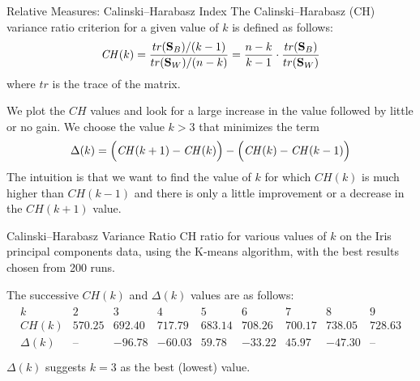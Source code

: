 \begin{frame}{Relative Measures: Calinski--Harabasz Index}
The Calinski--Harabasz (CH) variance ratio criterion for a given value of $k$
is def\/{i}ned as follows:
\begin{align*}
  \mathit{CH}(k) = \frac{tr(\mathbf{S}_B)/(k-1)}{tr(\mathbf{S}_W)/(n-k)} =
  \frac{n-k}{k-1} \cdot \frac{tr(\mathbf{S}_B)}{tr(\mathbf{S}_W)}
\end{align*}
where $tr$ is the trace of the matrix.

\medskip
We plot the $\mathit{CH}$ values and look for a large increase in the
value followed by little or no gain. We choose
the value $k>3$ that minimizes the term
\begin{align*}
  \Delta(k) = \Bigl(\mathit{CH}(k+1)-\mathit{CH}(k)\Bigr) - \Bigl(\mathit{CH}(k)-\mathit{CH}(k-1)\Bigr)
\end{align*}
The intuition is that we want to f\/{i}nd the value of $k$ for which $\mathit{CH}(k)$ is much higher than
$\mathit{CH}(k-1)$ and there is only a
little improvement or a decrease in the
$\mathit{CH}(k + 1)$ value.

\end{frame}



\begin{frame}[fragile]{Calinski--Harabasz Variance Ratio}
  \small
  CH ratio for various values
  of $k$ on the Iris principal components data, using the K-means
  algorithm, with the best results chosen from 200 runs.
\begin{figure}
    \centering
    \def\pshlabel#1{ {\footnotesize #1}}
    \def\psvlabel#1{ {\footnotesize #1}}
\end{figure}
\vspace{0.2in}
  The successive
  $\mathit{CH}(k)$ and $\Delta(k)$ values are as follows:
  \begin{align*}
    \begin{array}{c|cccccccc}
    k & 2 & 3 & 4 & 5 & 6 & 7 & 8 & 9\\
    \hline
    \mathit{CH}(k) & 570.25 & 692.40 & 717.79 & 683.14 & 708.26 & 700.17 & 738.05
    & 728.63\\
    \Delta(k) & \text{--} & -96.78 & -60.03 & 59.78 & -33.22 & 45.97 &
    -47.30 & \text{--}\\
    \end{array}
  \end{align*}
$\Delta(k)$ suggests $k=3$ as the best (lowest) value.
\end{frame}


